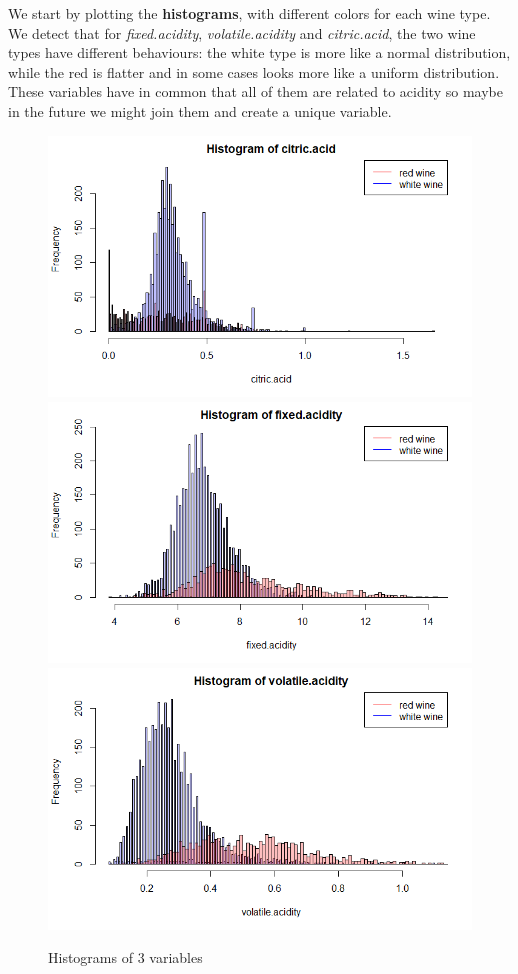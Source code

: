 \documentclass[10pt]{article}
\begin{document}
We start by plotting the \textbf{histograms}, with different colors for each wine type. We detect that for \textit{fixed.acidity}, \textit{volatile.acidity} and \textit{citric.acid}, the two wine types have different behaviours: the white type is more like a normal distribution, while the red is flatter and in some cases looks more like a uniform distribution. These variables have in common that all of them are related to acidity so maybe in the future we might join them and create a unique variable.
\begin{figure}[H]
\centering
\caption{Histograms of 3 variables}
\includegraphics[scale=0.3]{histogram_of_citricacidity}
\includegraphics[scale=0.3]{histogram_of_fixedacidity}
\includegraphics[scale=0.3]{histogram_of_volatileacidity}
\end{figure}
\end{document}
